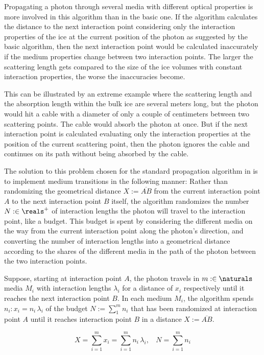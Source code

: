 Propagating a photon through several media with different optical properties is more involved in this algorithm than in the basic one.
If the algorithm calculates the distance to the next interaction point considering only the interaction properties of the ice at the current position of the photon as suggested by the basic algorithm, then the next interaction point would be calculated inaccurately if the medium properties change between two interaction points. The larger the scattering length gets compared to the size of the ice volumes with constant interaction properties, the worse the inaccuracies become.

This can be illustrated by an extreme example where the scattering length and the absorption length within the bulk ice are several meters long, but the photon would hit a cable with a diameter of only a couple of centimeters between two scattering points. The cable would absorb the photon at once. But if the next interaction point is calculated evaluating only the interaction properties at the position of the current scattering point, then the photon ignores the cable and continues on its path without being absorbed by the cable.

The solution to this problem chosen for the standard propagation algorithm in \icecube is to implement medium transitions in the following manner:
Rather than randomizing the geometrical distance $X:=\overline{AB}$ from the current interaction point $A$ to the next interaction point $B$ itself, the algorithm randomizes the number $N :\in \reals^+$ of interaction lengths the photon will travel to the interaction point, like a budget. This budget is spent by considering the different media on the way from the current interaction point along the photon's direction, and converting the number of interaction lengths into a geometrical distance according to the shares of the different media in the path of the photon between the two interaction points.

Suppose, starting at interaction point $A$, the photon travels in $m :\in \naturals$ media $M_i$ with interaction lengths $\lambda_i$ for a distance of $x_i$ respectively until it reaches the next interaction point $B$. In each medium $M_i$, the algorithm spends $n_i: x_i = n_i\,\lambda_i$ of the budget $N:=\sum_1^m n_i$ that has been randomized at interaction point $A$ until it reaches interaction point $B$ in a distance $X:=\overline{AB}$.

\begin{equation}
  X = \sum_{i=1}^m x_i = \sum_{i=1}^m n_i\,\lambda_i, \ \ \ \ N = \sum_{i=1}^m n_i
  \label{eq:convertbudgettodistance}
\end{equation}

